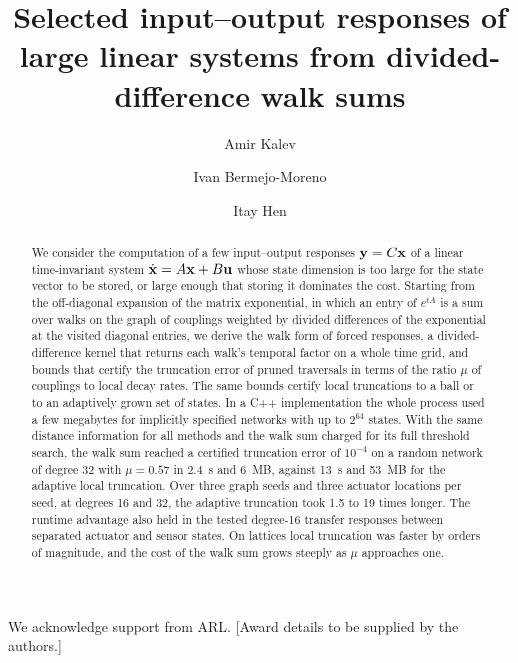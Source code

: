 \documentclass[aps,pra,superscriptaddress,floatfix,longbibliography,twocolumn]{revtex4-2}
\newcommand{\bx}{{\bf x}}
\newcommand{\bu}{{\bf u}}
\newcommand{\by}{{\bf y}}
\begin{document}
\title{Selected input--output responses of large linear systems from divided-difference walk sums}
\author{Amir Kalev}
\author{Ivan Bermejo-Moreno}
\author{Itay Hen}

\begin{abstract}
We consider the computation of a few input--output responses $\by=C\bx$ of a linear time-invariant system $\dot\bx=A\bx+B\bu$ whose state dimension is too large for the state vector to be stored, or large enough that storing it dominates the cost. Starting from the off-diagonal expansion of the matrix exponential, in which an entry of $e^{tA}$ is a sum over walks on the graph of couplings weighted by divided differences of the exponential at the visited diagonal entries, we derive the walk form of forced responses, a divided-difference kernel that returns each walk's temporal factor on a whole time grid, and bounds that certify the truncation error of pruned traversals in terms of the ratio $\mu$ of couplings to local decay rates. The same bounds certify local truncations to a ball or to an adaptively grown set of states. In a C++ implementation the whole process used a few megabytes for implicitly specified networks with up to $2^{64}$ states. With the same distance information for all methods and the walk sum charged for its full threshold search, the walk sum reached a certified truncation error of $10^{-4}$ on a random network of degree 32 with $\mu=0.57$ in 2.4~s and 6~MB, against 13~s and 53~MB for the adaptive local truncation. Over three graph seeds and three actuator locations per seed, at degrees 16 and 32, the adaptive truncation took 1.5 to 19 times longer. The runtime advantage also held in the tested degree-16 transfer responses between separated actuator and sensor states. On lattices local truncation was faster by orders of magnitude, and the cost of the walk sum grows steeply as $\mu$ approaches one.
\end{abstract}
\maketitle







\begin{acknowledgments}
We acknowledge support from ARL. [Award details to be supplied by the authors.]
\end{acknowledgments}

\appendix





\end{document}
